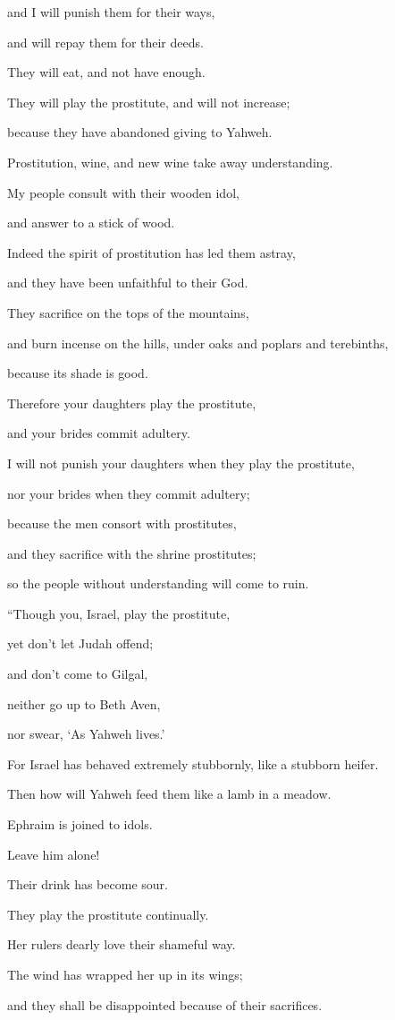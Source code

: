 {\par }{\QB and I will punish them for their ways,
\par }{\QB and will repay them for their deeds.
\par }{\Q {}They will eat, and not have enough.
\par }{\QB They will play the prostitute, and will not increase;
\par }{\QB because they have abandoned giving to Yahweh.
\par }{\Q {}Prostitution, wine, and new wine take away understanding.
\par }{\QB {}My people consult with their wooden idol,
\par }{\QB and answer to a stick of wood.
\par }{\Q Indeed the spirit of prostitution has led them astray,
\par }{\QB and they have been unfaithful to their God.
\par }{\Q {}They sacrifice on the tops of the mountains,
\par }{\QB and burn incense on the hills, under oaks and poplars and terebinths,
\par }{\QB because its shade is good.
\par }{\Q Therefore your daughters play the prostitute,
\par }{\QB and your brides commit adultery.
\par }{\Q {}I will not punish your daughters when they play the prostitute,
\par }{\QB nor your brides when they commit adultery;
\par }{\Q because the men consort with prostitutes,
\par }{\QB and they sacrifice with the shrine prostitutes;
\par }{\QB so the people without understanding will come to ruin.
\par }{\BB \par }{\Q {}“Though you, Israel, play the prostitute,
\par }{\QB yet don’t let Judah offend;
\par }{\QB and don’t come to Gilgal,
\par }{\QB neither go up to Beth Aven,
\par }{\QB nor swear, ‘As Yahweh lives.’
\par }{\Q {}For Israel has behaved extremely stubbornly, like a stubborn heifer.
\par }{\QB Then how will Yahweh feed them like a lamb in a meadow.
\par }{\Q {}Ephraim is joined to idols.
\par }{\QB Leave him alone!
\par }{\Q {}Their drink has become sour.
\par }{\QB They play the prostitute continually.
\par }{\QB Her rulers dearly love their shameful way.
\par }{\Q {}The wind has wrapped her up in its wings;
\par }{\QB and they shall be disappointed because of their sacrifices.
\par }{\BB \par }
